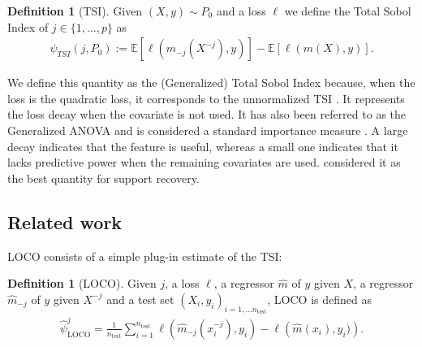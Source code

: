\documentclass{article}
\theoremstyle{plain}
\theoremstyle{definition}
\newtheorem{definition}[theorem]{Definition}
\theoremstyle{remark}
\newcommand{\e}[1]{\mathbb{E}\left[#1\right]  } %
\begin{document}

\begin{definition}[TSI]\label{def:TSI} Given $(X, y)\sim P_0$ and a loss $\ell$ we define the Total Sobol Index of $j\in\{1, \ldots, p\}$ as
\begin{align*}
    \psi_{TSI}(j, P_0):=\e{\ell\left(m_{-j}(X^{-j}), y\right)}-\e{\ell(m(X), y)}.
\end{align*}
\end{definition}

We define 
this quantity as the (Generalized) Total Sobol Index because, when the loss is the quadratic loss, it corresponds to the unnormalized TSI \citep{first-total-order-effects}. 
%
It represents the loss decay when the covariate is not used. It has also been referred to as the Generalized ANOVA \citep{williamson2021} and is considered a standard importance measure \citep{lei2018, Rinaldo2019, Hooker2021, scornet2022mda, williamson2023general}. A large decay indicates that the feature is useful, whereas a small one indicates that it lacks predictive power when the remaining covariates are used. \citet{scornet2022mda} considered it as the best quantity for support recovery.

\subsection{Related work}

LOCO consists of a simple plug-in estimate of the TSI: 

\begin{definition}[LOCO] Given $j$, a loss $\ell$, a regressor $\widehat{m}$ of $y$ given $X$, a regressor $\widehat{m}_{-j}$ of $y$ given $X^{-j}$ and a test set $(X_i, y_i)_{i=1,\ldots n_\mathrm{test}}$, LOCO is defined as
\begin{align*}
    \widehat{\psi}_\mathrm{LOCO}^j=\frac{1}{n_{\mathrm{test}}}\sum_{i=1}^{n_{\mathrm{test}}}\ell\left(\widehat{m}_{-j}(x_{i}^{-j}), y_i\right)-\ell\left(\widehat{m}(x_{i}),y_i)\right).
\end{align*}
\end{definition}

\end{document}
